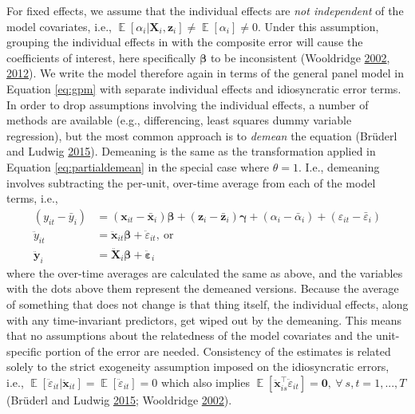 \documentclass[
  12pt,
  a4paper]{article}
\DeclareMathOperator{\E}{\mathbb{E}}
\begin{document}
For fixed effects, we assume that the individual effects are
\textit{not independent} of the model covariates, i.e.,
\(\E[\alpha_{i}|\bm{X}_{i},\bm{z}_{i}] \ne \E[\alpha_{i}] \ne 0\). Under
this assumption, grouping the individual effects in with the composite
error will cause the coefficients of interest, here specifically
\(\bm{\beta}\) to be inconsistent (Wooldridge
\protect\hyperlink{ref-Wooldridge2002}{2002},
\protect\hyperlink{ref-Wooldridge2012}{2012}). We write the model
therefore again in terms of the general panel model in Equation
\eqref{eq:gpm} with separate individual effects and idiosyncratic error
terms. In order to drop assumptions involving the individual effects, a
number of methods are available (e.g., differencing, least squares dummy
variable regression), but the most common approach is to \textit{demean}
the equation (Brüderl and Ludwig
\protect\hyperlink{ref-Bruederl2015}{2015}). Demeaning is the same as
the transformation applied in Equation \eqref{eq:partialdemean} in the
special case where \(\theta = 1\). I.e., demeaning involves subtracting
the per-unit, over-time average from each of the model terms, i.e.,
\begin{align}
(y_{it} - \bar{y}_{i}) & = (\bm{x}_{it} - \bar{\bm{x}}_{i})\bm{\beta} + (\bm{z}_{i} - \bar{\bm{z}}_{i})\bm{\gamma} + (\alpha_{i} - \bar{\alpha}_{i}) + (\varepsilon_{it} - \bar{\varepsilon}_{i}) \\
\ddot{y}_{it} & = \bm{\ddot{x}}_{it}\bm{\beta} + \ddot{\varepsilon}_{it}, \ \text{or} \\
\bm{\ddot{y}}_{i} & = \bm{\ddot{X}}_{i}\bm{\beta} + \bm{\ddot{\varepsilon}}_{i} \label{eq:fe}
\end{align} where the over-time averages are calculated the same as
above, and the variables with the dots above them represent the demeaned
versions. Because the average of something that does not change is that
thing itself, the individual effects, along with any time-invariant
predictors, get wiped out by the demeaning. This means that no
assumptions about the relatedness of the model covariates and the
unit-specific portion of the error are needed. Consistency of the
estimates is related solely to the strict exogeneity assumption imposed
on the idiosyncratic errors, i.e.,
\(\E[\ddot{\varepsilon}_{it}|\bm{\ddot{x}}_{it}] = \E[\ddot{\varepsilon}_{it}] = 0\)
which also implies
\(\E[\bm{\ddot{x}}_{is}^{\intercal}\ddot{\varepsilon}_{it}] = \bm{0}, \ \forall \ s, t = 1, ..., T\)
(Brüderl and Ludwig \protect\hyperlink{ref-Bruederl2015}{2015};
Wooldridge \protect\hyperlink{ref-Wooldridge2002}{2002}).
\end{document}
